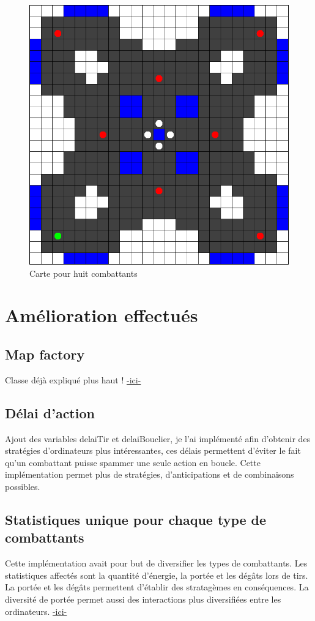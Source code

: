 \documentclass[a4paper,12pt]{article}
\begin{document}
\begin{figure}[h!]
\begin{minipage}{0.4\linewidth}
			\includegraphics[width=\linewidth]{carte_4}
			\caption{Carte pour huit combattants}
		\end{minipage}
	\end{figure}
	
	\section{Amélioration effectués}
	\subsection{Map factory}
	Classe déjà expliqué plus haut ! 
	\hyperref[sec:carte]{-ici-}
	\subsection{Délai d'action}
	Ajout des variables delaiTir et delaiBouclier, je l'ai implémenté afin d'obtenir des stratégies d'ordinateurs plus intéressantes, ces délais permettent d’éviter le fait qu'un combattant puisse spammer une seule action en boucle. Cette implémentation permet plus de stratégies, d'anticipations et de combinaisons possibles. 
	\subsection{Statistiques unique pour chaque type de combattants}
	Cette implémentation avait pour but de diversifier les types de combattants. Les statistiques affectés sont la quantité d’énergie, la portée et les dégâts lors de tirs. La portée et les dégâts permettent d'établir des stratagèmes en conséquences. La diversité de portée permet aussi des interactions plus diversifiées entre les ordinateurs.
	\hyperref[sec:stats]{-ici-}
\end{document}
